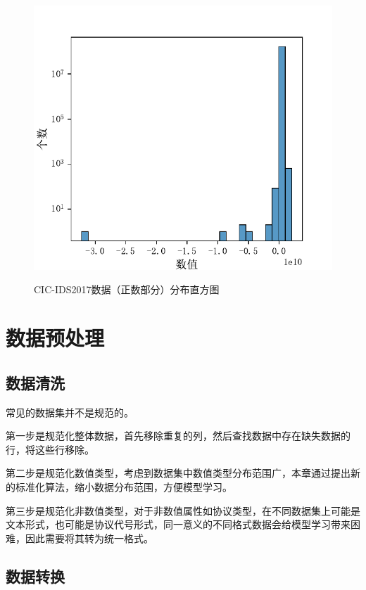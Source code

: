 \begin{figure}[htbp]
{\begin{minipage}{.5\textwidth}
\includegraphics[width=1\linewidth]{img/preprocessing/cic2017_bigdata.pdf} %
\label{fig:cic2017_bighist}
\end{minipage}
}

\caption{CIC-IDS2017数据（正数部分）分布直方图} %
\label{fig:cic2017_hist}
\end{figure}

\section{数据预处理}
\subsection{数据清洗}
常见的数据集并不是规范的。

第一步是规范化整体数据，首先移除重复的列，然后查找数据中存在缺失数据的行，将这些行移除。

第二步是规范化数值类型，考虑到数据集中数值类型分布范围广，本章通过提出新的标准化算法，缩小数据分布范围，方便模型学习。

第三步是规范化非数值类型，对于非数值属性如协议类型，在不同数据集上可能是文本形式，也可能是协议代号形式，同一意义的不同格式数据会给模型学习带来困难，因此需要将其转为统一格式。


\subsection{数据转换}
